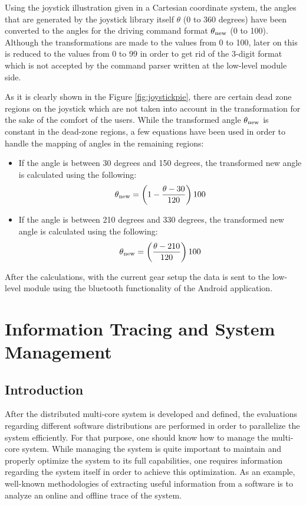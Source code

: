 Using the joystick illustration given in a Cartesian coordinate system, the angles that are generated by the joystick library itself $\theta$ (0 to 360 degrees) have been converted to the angles for the driving command format $\theta\textsubscript{new}$ (0 to 100). Although the transformations are made to the values from 0 to 100, later on this is reduced to the values from 0 to 99 in order to get rid of the 3-digit format which is not accepted by the command parser written at the low-level module side.

As it is clearly shown in the Figure \ref{fig:joystickpie}, there are certain dead zone regions on the joystick which are not taken into account in the transformation for the sake of the comfort of the users. While the transformed angle $\theta\textsubscript{new}$ is  constant in the dead-zone regions, a few equations have been used in order to handle the mapping of angles in the remaining regions:
\begin{itemize}
	\item If the angle is between 30 degrees and 150 degrees, the transformed new angle is calculated using the following:
	\begin{equation}
	\theta\textsubscript{new}=\left(1 - \frac{\theta - 30}{120}\right) 100
	\end{equation}
	\item If the angle is between 210 degrees and 330 degrees, the transformed new angle is calculated using the following:
	\begin{equation}
	\theta\textsubscript{new}=\left(\frac{\theta - 210}{120}\right) 100
	\end{equation} 
\end{itemize}
After the calculations, with the current gear setup the data is sent to the low-level module using the bluetooth functionality of the Android application.


\chapter{Information Tracing and System Management} \label{informationchapter}
\section{Introduction}
After the distributed multi-core system is developed and defined, the evaluations regarding different software distributions are performed in order to parallelize the system efficiently. For that purpose, one should know how to manage the multi-core system. While managing the system is quite important to maintain and properly optimize the system to its full capabilities, one requires information regarding the system itself in order to achieve this optimization. As an example, well-known methodologies of extracting useful information from a software is to analyze an online and offline trace of the system. 


